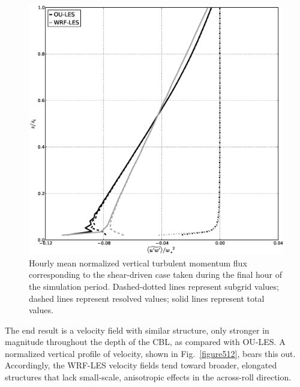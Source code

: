 \begin{figure}[!ht]
\begin{center}
\includegraphics[width=\textwidth]{figures/chapter5/stress13}
\end{center}
\caption{Hourly mean normalized vertical turbulent momentum flux corresponding to the shear-driven case taken during the final hour of the simulation period. Dashed-dotted lines represent subgrid values; dashed lines represent resolved values; solid lines represent total values.}
\label{figure511}
\end{figure}


The end result is a velocity field with similar structure, only stronger in magnitude throughout the depth of the CBL, as compared with OU-LES. A normalized vertical profile of velocity, shown in Fig.~\ref{figure512}, bears this out. Accordingly, the WRF-LES velocity fields tend toward broader, elongated structures that lack small-scale, anisotropic effects in the across-roll direction.


